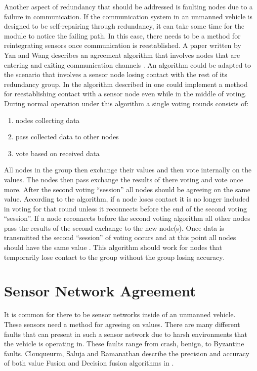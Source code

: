 \documentclass[twoside, conference]{IEEEtran}
\begin{document}
Another aspect of redundancy that should be addressed is faulting nodes due to a failure in communication. If the communication system in an unmanned vehicle is designed to be self-repairing through redundancy, it can take some time for the module to notice the failing path. In this case, there needs to be a method for reintegrating sensors once communication is reestablished. A paper written by Yan and Wang describes an agreement algorithm that involves nodes that are entering and exiting communication channels \cite{Yan2007}. An algorithm could be adapted to the scenario that involves a sensor node losing contact with the rest of its redundancy group. In the algorithm described in \cite{Yan2007} one could implement a method for reestablishing contact with a sensor node even while in the middle of voting. During normal operation under this algorithm a single voting rounds consists of:
\begin{enumerate}
	\item nodes collecting data
	\item pass collected data to other nodes 
	\item vote based on received data
\end{enumerate} 
All nodes in the group then exchange their values and then vote internally on the values. The nodes then pass exchange the results of there voting and vote once more. After the second voting ``session'' all nodes should be agreeing on the same value. According to the algorithm, if a node loses contact it is no longer included in voting for that round unless it reconnects before the end of the second voting ``session''. If a node reconnects before the second voting algorithm all other nodes pass the results of the second exchange to the new node(s). Once data is transmitted the second ``session'' of voting occurs and at this point all nodes should have the same value \cite{Yan2007}. This algorithm should work for nodes that temporarily lose contact to the group without the group losing accuracy.

\section{Sensor Network Agreement}\label{sec:sensornet-agreement}
It is common for there to be sensor networks inside of an unmanned vehicle. These sensors need a method for agreeing on values. There are many different faults that can present in such a sensor network due to harsh environments that the vehicle is operating in. These faults range from crash, benign, to Byzantine faults. Clouqueurm, Saluja and Ramanathan describe the precision and accuracy of both value Fusion and Decision fusion algorithms in \cite{clouqueur2004}. 
\end{document}
